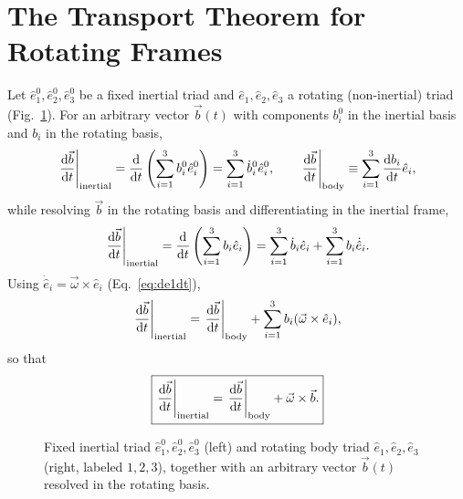 \documentclass[11pt]{article}
\begin{document}
\section{The Transport Theorem for Rotating Frames}

Let $\hat e_1^0,\hat e_2^0,\hat e_3^0$ be a fixed inertial triad and $\hat e_1,\hat e_2,\hat e_3$ a rotating (non-inertial) triad (Fig.~\ref{fig:frames}). For an arbitrary vector $\vec b(t)$ with components $b_i^0$ in the inertial basis and $b_i$ in the rotating basis,
\begin{equation}
\left.\frac{\mathrm{d} \vec b}{\mathrm{d} t}\right|_{\mathrm{inertial}} = \frac{\mathrm{d} }{\mathrm{d} t}\left(\sum_{i=1}^3 b_i^0\hat e_i^0\right) = \sum_{i=1}^3 \dot b_i^0\hat e_i^0, \qquad
\left.\frac{\mathrm{d} \vec b}{\mathrm{d} t}\right|_{\mathrm{body}} \equiv \sum_{i=1}^3 \frac{\mathrm{d} b_i}{\mathrm{d} t}\hat e_i,
\label{eq:body-deriv-def}
\end{equation}
while resolving $\vec b$ in the rotating basis and differentiating in the inertial frame,
\begin{equation}
\left.\frac{\mathrm{d} \vec b}{\mathrm{d} t}\right|_{\mathrm{inertial}} = \frac{\mathrm{d} }{\mathrm{d} t}\left(\sum_{i=1}^3 b_i\hat e_i\right) = \sum_{i=1}^3 \dot b_i\hat e_i + \sum_{i=1}^3 b_i\dot{\hat e}_i.
\label{eq:body-deriv-expand}
\end{equation}
Using $\dot{\hat e}_i=\vec\omega\times\hat e_i$ (Eq.~\eqref{eq:de1dt}),
\begin{equation}
\left.\frac{\mathrm{d} \vec b}{\mathrm{d} t}\right|_{\mathrm{inertial}} = \left.\frac{\mathrm{d} \vec b}{\mathrm{d} t}\right|_{\mathrm{body}} + \sum_{i=1}^3 b_i(\vec\omega\times\hat e_i),
\label{eq:transport-sum}
\end{equation}
so that
\begin{equation}
\boxed{\left.\frac{\mathrm{d} \vec b}{\mathrm{d} t}\right|_{\mathrm{inertial}} = \left.\frac{\mathrm{d} \vec b}{\mathrm{d} t}\right|_{\mathrm{body}} + \vec\omega\times\vec b.}
\label{eq:transport}
\end{equation}

\begin{figure}[htb]
\centering
{}
\caption{Fixed inertial triad $\hat e_1^0,\hat e_2^0,\hat e_3^0$ (left) and rotating body triad $\hat e_1,\hat e_2,\hat e_3$ (right, labeled $1,2,3$), together with an arbitrary vector $\vec b(t)$ resolved in the rotating basis.}
\label{fig:frames}
\end{figure}
\end{document}
